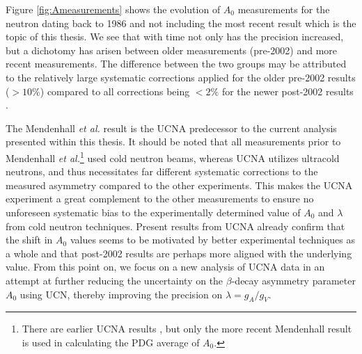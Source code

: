 Figure \ref{fig:Ameasurements} shows the evolution of $A_0$ measurements for the neutron dating back to
1986 and not including the most recent result which is the topic of this thesis. We see that
with time not only has the precision increased, but a dichotomy has arisen between older measurements
(pre-2002) and more recent measurements. The difference between the two groups may be attributed
to the relatively large systematic corrections applied for the older pre-2002 results ($>10\%$) compared to
all corrections being $<2\%$ for the newer post-2002 results \cite{brown2017}.

The Mendenhall \textit{et al.} result \cite{mendenhall2013} is the UCNA predecessor to the current analysis
presented within this thesis. It should be noted that all measurements prior to Mendenhall
\textit{et al.}\footnote{There are earlier UCNA results \cite{pattie2009first,liu2010determination}, but only the more recent
  Mendenhall result is used in calculating the PDG average of $A_0$.}
used cold neutron beams, whereas UCNA utilizes ultracold neutrons, and thus necessitates far different
systematic corrections to the measured asymmetry compared to the other experiments. This makes the UCNA experiment
a great complement to the other measurements to ensure no unforeseen systematic bias to the experimentally
determined value of $A_0$ and $\lambda$ from cold neutron techniques. Present results from UCNA already
confirm that the shift in $A_0$ values seems to
be motivated by better experimental techniques as a whole and that post-2002 results are perhaps more aligned with the
underlying value. From this point on, we focus on a new analysis of UCNA data in an
attempt at further reducing the uncertainty on the $\beta$-decay asymmetry parameter $A_0$ using UCN, thereby improving
the precision on $\lambda=g_A/g_V$.














